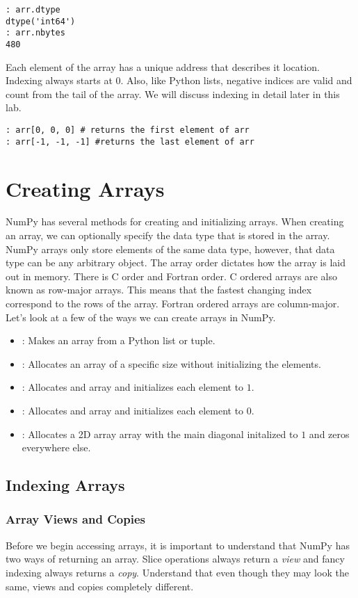 \begin{lstlisting}
: arr.dtype
dtype('int64')
: arr.nbytes
480
\end{lstlisting}

Each element of the array has a unique address that describes it location.  Indexing always starts at $0$.  Also, like Python lists, negative indices are valid and count from the tail of the array.  We will discuss indexing in detail later in this lab.

\begin{lstlisting}
: arr[0, 0, 0] # returns the first element of arr
: arr[-1, -1, -1] #returns the last element of arr
\end{lstlisting}

\section*{Creating Arrays}
NumPy has several methods for creating and initializing arrays.  When creating an array, we can optionally specify the data type that is stored in the array.  NumPy arrays only store elements of the same data type, however, that data type can be any arbitrary object.  The array order dictates how the array is laid out in memory.  There is C order and Fortran order.  C ordered arrays are also known as row-major arrays.  This means that the fastest changing index correspond to the rows of the array.  Fortran ordered arrays are column-major.  Let's look at a few of the ways we can create arrays in NumPy.
\begin{itemize}
\item {}: Makes an array from a Python list or tuple.
\item {}: Allocates an array of a specific size without initializing the elements.
\item {}: Allocates and array and initializes each element to $1$.
\item {}: Allocates and array and initializes each element to $0$.
\item {}: Allocates a 2D array array with the main diagonal initalized to $1$ and zeros everywhere else.
\end{itemize}

\subsection*{Indexing Arrays}
\subsubsection*{Array Views and Copies}
Before we begin accessing arrays, it is important to understand that NumPy has two ways of returning an array.  Slice operations always return a \emph{view} and fancy indexing always returns a \emph{copy}.  Understand that even though they may look the same, views and copies completely different.

